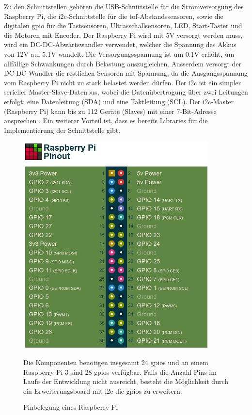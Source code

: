 Zu den Schnittstellen gehören die USB-Schnittstelle für die Stromversorgung des Raspberry Pi, die \acrshort{i2c}-Schnittstelle für die \acrshort{tof}-Abstandssensoren, sowie die digitalen \acrfull{gpio} für die Tastsensoren, Ultrasschallsensoren, LED, Start-Taster und die Motoren mit Encoder. Der Raspberry Pi wird mit 5V versorgt werden muss, wird ein DC-DC-Abwärtswandler verwendet, welcher die Spannung des Akkus von 12V auf 5.1V wandelt. Die Versorgungsspannung ist um 0.1V erhöht, um allfällige Schwankungen durch Belastung auszugleichen. Ausserdem versorgt der DC-DC-Wandler die restlichen Sensoren mit Spannung, da die Ausgangsspannung vom Raspberry Pi nicht zu stark belastet werden dürfen.
Der \acrshort{i2c} ist ein simpler serieller Master-Slave-Datenbus, wobei die Datenübertragung über zwei Leitungen erfolgt: eine Datenleitung (SDA) und eine Taktleitung (SCL). Der \acrshort{i2c}-Master (Raspberry Pi) kann bis zu 112 Geräte (Slaves) mit einer 7-Bit-Adresse ansprechen \cite{I2C}. Ein weiterer Vorteil ist, dass es bereits Libraries für die Implementierung der Schnittstelle gibt.

\newpage
\begin{figure}[ht]
 \begin{minipage}{0.5\textwidth}
 \includegraphics[width=0.9\textwidth]{img/Funktionsmuster Treppensteigen/Pinout.png}
 \caption{Pinbelegung eines Raspberry Pi}
 \end{minipage} 
	\hfill
	\begin{minipage}{0.5\textwidth}
 Die Komponenten benötigen insgesamt 24 \acrshort{gpio}s und an einem Raspberry Pi 3 sind 28 \acrshort{gpio}s verfügbar\footnotemark. Falls die Anzahl Pins im Laufe der Entwicklung nicht ausreicht, besteht die Möglichkeit durch ein Erweiterungsboard mit \acrshort{i2c} die \acrshort{gpio}s zu erweitern.
 \vspace{5cm}
 \end{minipage}
\end{figure}
